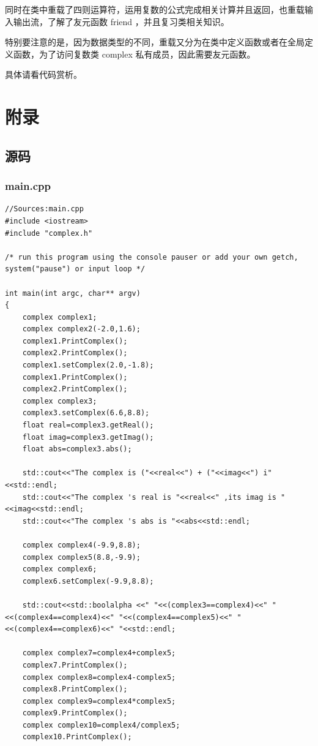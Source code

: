 \documentclass[UTF8,18pt]{ctexart}
\begin{document}
{同时在类中重载了四则运算符，运用复数的公式完成相关计算并且返回，也重载输入输出流，了解了友元函数 friend ，并且复习类相关知识。

特别要注意的是，因为数据类型的不同，重载又分为在类中定义函数或者在全局定义函数，为了访问复数类 complex 私有成员，因此需要友元函数。

具体请看代码赏析。



\section{附录}
\subsection{源码}

\subsubsection{main.cpp}
\begin{verbatim}
//Sources:main.cpp
#include <iostream>
#include "complex.h"

/* run this program using the console pauser or add your own getch, system("pause") or input loop */

int main(int argc, char** argv)
{
	complex complex1;
	complex complex2(-2.0,1.6);
	complex1.PrintComplex();
	complex2.PrintComplex();
	complex1.setComplex(2.0,-1.8);
	complex1.PrintComplex();
	complex2.PrintComplex();
	complex complex3;
	complex3.setComplex(6.6,8.8);
	float real=complex3.getReal();
	float imag=complex3.getImag();
	float abs=complex3.abs();

	std::cout<<"The complex is ("<<real<<") + ("<<imag<<") i"<<std::endl;
	std::cout<<"The complex 's real is "<<real<<" ,its imag is "<<imag<<std::endl;
	std::cout<<"The complex 's abs is "<<abs<<std::endl;

	complex complex4(-9.9,8.8);
	complex complex5(8.8,-9.9);
	complex complex6;
	complex6.setComplex(-9.9,8.8);

	std::cout<<std::boolalpha <<" "<<(complex3==complex4)<<" "<<(complex4==complex4)<<" "<<(complex4==complex5)<<" "<<(complex4==complex6)<<" "<<std::endl;

	complex complex7=complex4+complex5;
	complex7.PrintComplex();
	complex complex8=complex4-complex5;
	complex8.PrintComplex();
	complex complex9=complex4*complex5;
	complex9.PrintComplex();
	complex complex10=complex4/complex5;
	complex10.PrintComplex();


\end{verbatim}}
\end{document}
